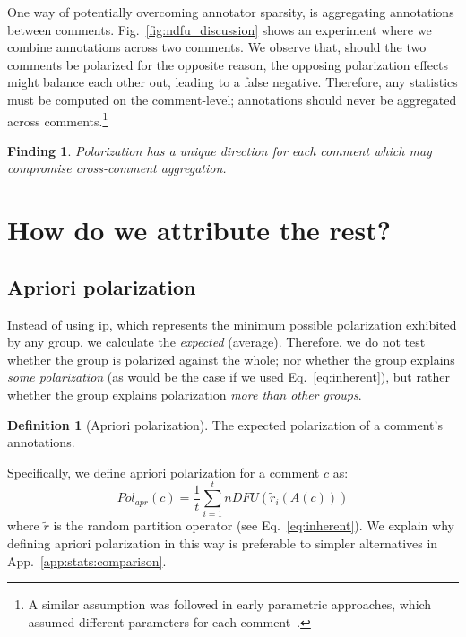 \documentclass[11pt]{article}
\theoremstyle{definition}
\newtheorem{definition}{Definition}
\theoremstyle{plain}
\newtheorem{finding}{Finding}
\begin{document}
One way of potentially overcoming annotator sparsity, is aggregating annotations between comments. Fig.~\ref{fig:ndfu_discussion} shows an experiment where we combine annotations across two comments. We observe that, should the two comments be polarized for the opposite reason, the opposing polarization effects might balance each other out, leading to a false negative. Therefore, any statistics must be computed on the comment-level; annotations should never be aggregated across comments.\footnote{A similar assumption was followed in early parametric approaches, which assumed different parameters for each comment~\cite{checco_2017}.}

\begin{finding}
	\label{finding:conflicting}
	Polarization has a unique direction for each comment which may compromise cross-comment aggregation.
\end{finding}


\section{How do we attribute the rest?}
\label{sec:apunim}

\subsection{Apriori polarization}
\label{sec:apunim:group-vs-global}

Instead of using \ac{ip}, which represents the minimum possible polarization exhibited by any group, we calculate the \emph{expected} (average). Therefore, we do not test whether the group is polarized against the whole; nor whether the group explains \emph{some polarization} (as would be the case if we used Eq.~\ref{eq:inherent}), but rather whether the group explains polarization \emph{more than other groups}.

\begin{definition}[Apriori polarization]
	\label{def:apriori}
	The expected polarization of a comment's annotations.
\end{definition}

Specifically, we define apriori polarization for a comment $c$ as:
\begin{equation}
	\label{eq:apriori}
	Pol_{apr}(c) = \frac{1}{t} \sum_{i=1}^t  \textit{nDFU}(\tilde{r}_i (A(c)))
\end{equation}
\noindent where $\tilde{r}$ is the random partition operator (see Eq.~\ref{eq:inherent}). We explain why defining apriori polarization in this way is preferable to simpler alternatives in App.~\ref{app:stats:comparison}.
\end{document}
